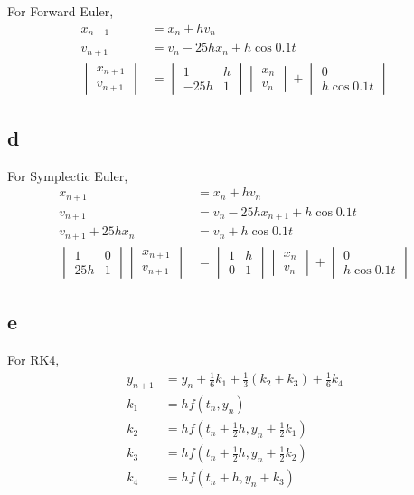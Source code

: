 \documentclass[letterpaper,10pt]{article}
\begin{document}
For Forward Euler, 
\begin{align*}
  x_{n+1}&=x_n+hv_n\\
  v_{n+1}&=v_n-25hx_n+h\cos 0.1t\\
  \begin{vmatrix}
    x_{n+1}\\v_{n+1}
  \end{vmatrix}&=\begin{vmatrix}
    1&h\\-25h&1
  \end{vmatrix}\begin{vmatrix}
    x_n\\v_n
  \end{vmatrix}+\begin{vmatrix}
    0\\h\cos 0.1t
  \end{vmatrix}
\end{align*}
\subsection{d}
For Symplectic Euler,
\begin{align*}
  x_{n+1}&=x_n+hv_n\\
  v_{n+1}&=v_n-25hx_{n+1}+h\cos 0.1t\\
  v_{n+1}+25hx_n&=v_n+h\cos 0.1t\\
  \begin{vmatrix}
    1&0\\25h&1
  \end{vmatrix}
  \begin{vmatrix}
    x_{n+1}\\v_{n+1}
  \end{vmatrix}&=\begin{vmatrix}
    1&h\\0&1
  \end{vmatrix}\begin{vmatrix}
    x_n\\v_n
  \end{vmatrix}+\begin{vmatrix}
    0\\h\cos 0.1t
  \end{vmatrix}
\end{align*}
\subsection{e}
For RK4, 
\begin{align*}
  y_{n+1}&=y_n+\frac{1}{6}k_1+\frac{1}{3}(k_2+k_3)+\frac{1}{6}k_4\\
  k_1&=hf\left(t_n,y_n\right)\\
  k_2&=hf\left(t_n+\frac{1}{2}h,y_n+\frac{1}{2}k_1\right)\\
  k_3&=hf\left(t_n+\frac{1}{2}h,y_n+\frac{1}{2}k_2\right)\\
  k_4&=hf\left(t_n+h,y_n+k_3\right)
\end{align*}
\end{document}
